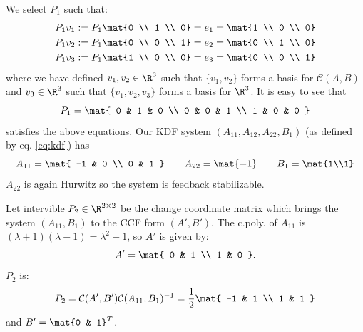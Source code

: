\documentclass{homework}
\newcommand{\control}{\mathcal{C}}
\begin{document}
We select $P_1$ such that:
\begin{align*}
    P_1 v_1 := P_1 \mat{0 \\ 1 \\ 0} = e_1 = \mat{1 \\ 0 \\ 0} \\
    P_1 v_2 := P_1 \mat{0 \\ 0 \\ 1} = e_2 = \mat{0 \\ 1 \\ 0} \\
    P_1 v_3 := P_1 \mat{1 \\ 0 \\ 0} = e_3 = \mat{0 \\ 0 \\ 1}
\end{align*}
where we have defined $v_1,v_2\in\R^3$ such that $\{v_1, v_2\}$ forms a basis for
$\control(A, B)$ and
$v_3\in\R^3$  such that $\{v_1,v_2,v_3\}$ forms a basis for $\R^3$. It is easy to see that
\begin{equation*}
    P_1 = \mat{
        0 & 1 & 0 \\
        0 & 0 & 1 \\
        1 & 0 & 0
    }
\end{equation*}
satisfies the above equations. Our KDF system $(A_{11}, A_{12}, A_{22}, B_1)$
(as defined by eq. \ref{eq:kdf})
has
\begin{equation*}
    A_{11} = \mat{
        -1 & 0 \\
        0 & 1
    } \qquad A_{22} = \mat{-1} \qquad B_1 = \mat{1\\1}
\end{equation*}
$A_{22}$ is again Hurwitz so the system is feedback stabilizable.

Let intervible $P_2\in\R^{2\times2}$ be the change coordinate matrix which brings
the system $(A_{11}, B_1)$ to the CCF form $(A', B')$.
The c.poly. of $A_{11}$ is
$(\lambda + 1)(\lambda - 1) = \lambda^2 - 1$, so $A'$ is given by:
\begin{equation*}
    A' = \mat{
        0 & 1 \\
        1 & 0
    }.
\end{equation*}
$P_2$ is:
\begin{equation*}
    P_2 = \control(A', B') \control(A_{11}, B_1)^{-1} = \frac{1}{2} \mat{
        -1 & 1 \\
        1 & 1
    }
\end{equation*}
and $B' = \mat{0 & 1}^T$.
\end{document}
